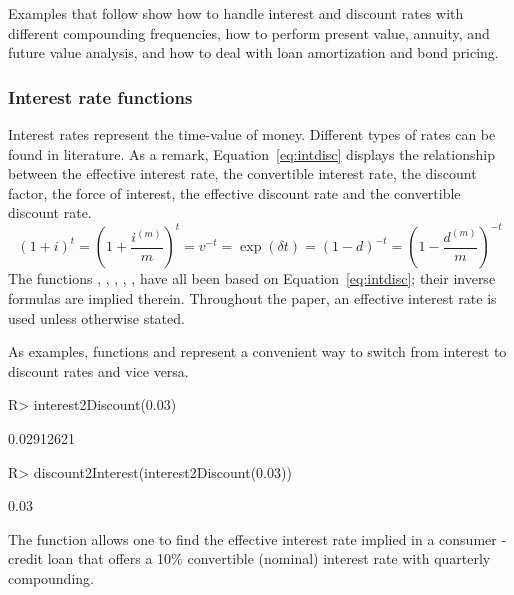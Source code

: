 \documentclass[nojss]{jss}
\begin{document}
Examples that follow show how to handle interest and discount rates
with different compounding frequencies, how to perform present value,
annuity, and future value analysis, and how to deal with loan
amortization and bond pricing.



\subsubsection{Interest rate functions}\label{sss:subsubInterest}
Interest rates represent the time-value of money. Different
types of rates can be found in literature. As a remark,
Equation~\ref{eq:intdisc} displays the relationship between the effective interest
rate, the convertible interest rate, the discount factor, the force of interest, the effective
discount rate and the convertible discount rate.
%
\begin{equation}
\left( 1 + i \right)^t = \left( 1 + \frac{i^{\left( m \right)}}{m} \right)^t = v^{-t} =
\exp \left( \delta t \right) = \left( 1 - d \right)^{ - t} = 
\left( 1 - \frac{d^{\left( m \right)}}{m} \right)^{ - t}
\label{eq:intdisc}
\end{equation}
%
The functions , ,
, \linebreak
{}, ,
 have all been based on
Equation~\ref{eq:intdisc}; their inverse formulas are implied
therein. Throughout the paper, an effective interest rate is used
unless otherwise stated.

As examples, functions  and
 represent a convenient way to switch from
interest to discount rates and vice versa.



\begin{Schunk}
\begin{Sinput}
R> interest2Discount(0.03)
\end{Sinput}
\begin{Soutput}
[1] 0.02912621
\end{Soutput}
\begin{Sinput}
R> discount2Interest(interest2Discount(0.03))
\end{Sinput}
\begin{Soutput}
[1] 0.03
\end{Soutput}
\end{Schunk}

The function  allows one to find the
effective interest rate implied in a consumer - credit loan that offers a 10\%
convertible (nominal) interest rate with quarterly compounding.
\end{document}
